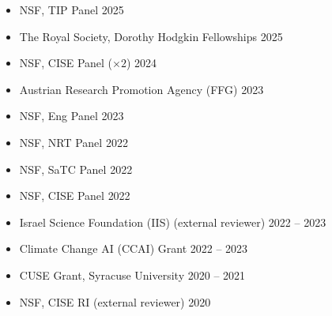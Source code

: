 \begin{itemize}
  \item 
  NSF, TIP Panel \hfill {2025}%
  \item 
  The Royal Society, Dorothy Hodgkin Fellowships \hfill {2025}%
  \item 
  NSF, CISE Panel \;($\times 2$) \hfill {2024}%
  \item 
  Austrian Research Promotion Agency (FFG) \hfill {2023}
  \item 
  NSF, Eng Panel \hfill {2023}
  \item 
  NSF, NRT Panel \hfill {2022}
  \item 
  NSF, SaTC Panel \hfill {2022} %
  \item 
  NSF, CISE Panel \hfill {2022} %
  \item 
  Israel Science Foundation (IIS) (external reviewer) \hfill {2022 -- 2023}
  \item 
  Climate Change AI (CCAI) Grant \hfill {2022 -- 2023}
  \item 
  CUSE Grant, Syracuse University \hfill {2020 -- 2021}
  \item 
  NSF, CISE RI (external reviewer) \hfill {2020}
\end{itemize}
